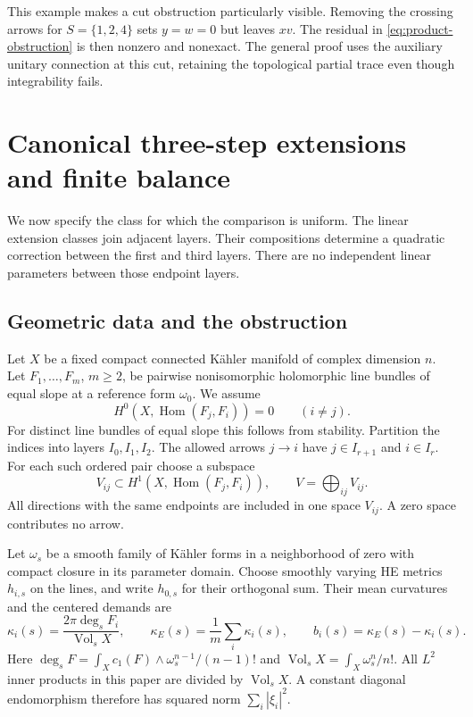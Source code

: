 \documentclass[11pt]{amsart}
\theoremstyle{definition}
\theoremstyle{remark}
\newcommand{\Hom}{\operatorname{Hom}}
\newcommand{\Vol}{\operatorname{Vol}}
\begin{document}
This example makes a cut obstruction particularly visible. Removing the
crossing arrows for $S=\{1,2,4\}$ sets $y=w=0$ but leaves $xv$.
The residual in \eqref{eq:product-obstruction} is then nonzero and
nonexact. The general proof uses the auxiliary unitary connection at this
cut, retaining the topological partial trace even though integrability fails.

\section{Canonical three-step extensions and finite balance}\label{sec:canonical}

We now specify the class for which the comparison is uniform. The linear
extension classes join adjacent layers. Their compositions determine a
quadratic correction between the first and third layers. There are no
independent linear parameters between those endpoint layers.

\subsection{Geometric data and the obstruction}
Let $X$ be a fixed compact connected K\"ahler manifold of complex dimension
$n$. Let $F_1,\ldots,F_m$, $m\ge2$, be pairwise nonisomorphic holomorphic
line bundles of equal slope at a reference form $\omega_0$. We assume
\begin{equation}\label{eq:cross-hom}
 H^0(X,\Hom(F_j,F_i))=0\qquad(i\ne j).
\end{equation}
For distinct line bundles of equal slope this follows from stability.
Partition the indices into layers $I_0,I_1,I_2$. The allowed arrows
$j\to i$ have $j\in I_{r+1}$ and $i\in I_r$. For each such ordered
pair choose a subspace
\[
 V_{ij}\subset H^1(X,\Hom(F_j,F_i)),\qquad
 V=\bigoplus_{ij}V_{ij}.
\]
All directions with the same endpoints are included in one space $V_{ij}$.
A zero space contributes no arrow.

Let $\omega_s$ be a smooth family of K\"ahler forms in a neighborhood of
zero with compact closure in its parameter domain. Choose smoothly varying
HE metrics $h_{i,s}$ on the lines, and write $h_{0,s}$ for their orthogonal
sum. Their mean curvatures and the centered demands are
\begin{equation}\label{eq:demands}
 \kappa_i(s)=\frac{2\pi\deg_s F_i}{\Vol_s X},\qquad
 \kappa_E(s)=\frac1m\sum_i\kappa_i(s),\qquad
 b_i(s)=\kappa_E(s)-\kappa_i(s).
\end{equation}
Here $\deg_s F=\int_Xc_1(F)\wedge\omega_s^{n-1}/(n-1)!$ and
$\Vol_sX=\int_X\omega_s^n/n!$. All $L^2$ inner products in this paper
are divided by $\Vol_sX$. A constant diagonal endomorphism therefore has
squared norm $\sum_i|\xi_i|^2$.
\end{document}
